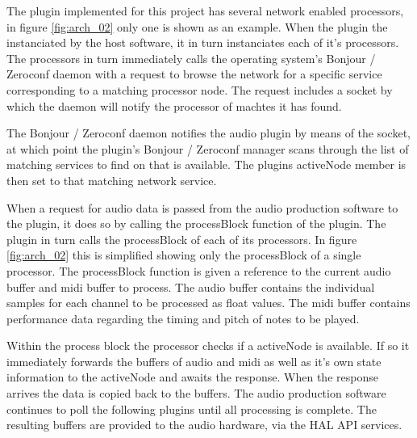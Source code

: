 The plugin implemented for this project has several network enabled processors, in figure \ref{fig:arch_02} only one is shown as an example. When the plugin the instanciated by the host software, it in turn instanciates each of it's processors. The processors in turn immediately calls the operating system's Bonjour / Zeroconf daemon with a request to browse the network for a specific service corresponding to a matching processor node. The request includes a socket by which the daemon will notify the processor of machtes it has found.

The Bonjour / Zeroconf daemon notifies the audio plugin by means of the socket, at which point the plugin's Bonjour / Zeroconf manager scans through the list of matching services to find on that is available. The plugins activeNode member is then set to that matching network service.

When a request for audio data is passed from the audio production software to the plugin, it does so by calling the processBlock function of the plugin. The plugin in turn calls the processBlock of each of its processors. In figure \ref{fig:arch_02} this is simplified showing only the processBlock of a single processor. The processBlock function is given a reference to the current audio buffer and midi buffer to process. The audio buffer contains the individual samples for each channel to be processed as float values. The midi buffer contains performance data regarding the timing and pitch of notes to be played.

Within the process block the processor checks if a activeNode is available. If so it immediately forwards the buffers of audio and midi as well as it's own state information to the activeNode and awaits the response. When the response arrives the data is copied back to the buffers. The audio production software continues to poll the following plugins until all processing is complete. The resulting buffers are provided to the audio hardware, via the HAL API services.
